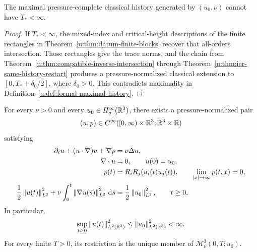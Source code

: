 \begin{corollary}
\label{u:cor:ier-maximal-time-contradiction}
The maximal pressure-complete classical history generated by
\((u_0,\nu)\) cannot have \(T_*<\infty\).
\end{corollary}

\begin{proof}
If \(T_*<\infty\), the mixed-index and critical-height descriptions of the
finite rectangles in Theorem~\ref{u:thm:datum-finite-blocks} recover that
all-orders intersection.  Those rectangles give the trace norms, and the chain from
Theorem~\ref{u:thm:compatible-inverse-intersection} through
Theorem~\ref{u:thm:ier-same-history-restart} produces a pressure-normalized classical
extension to \([0,T_*+\delta_0/2]\), where \(\delta_0>0\).  This contradicts
maximality in Definition~\ref{u:def:formal-maximal-history}.
\end{proof}

\begin{samepage}
\begin{theorem}
\label{u:thm:ier-global-smoothness}
For every \(\nu>0\) and every \(u_0\in H^\infty_\sigma(\mathbb R^3)\), there exists a
pressure-normalized pair
\begin{equation}
 (u,p)\in C^\infty([0,\infty)\times\mathbb R^3;\mathbb R^3\times\mathbb R)
 \label{u:eq:ier-global-class}
\end{equation}
satisfying
\begin{align}
 \partial_tu+(u\cdot\nabla)u+\nabla p&=\nu\Delta u,
 \label{u:eq:ier-global-momentum}\\
 \nabla\cdot u&=0,
 \qquad u(0)=u_0,
 \label{u:eq:ier-global-divergence-datum}\\
 p(t)&=R_iR_j(u_i(t)u_j(t)),
 \qquad \lim_{|x|\to\infty}p(t,x)=0,
 \label{u:eq:ier-global-pressure}\\
 \frac12\left\lVert u(t)\right\rVert_{L^2}^2
 +\nu\int_0^t\left\lVert \nabla u(s)\right\rVert_{L^2}^2\,\mathrm d s
 &=\frac12\left\lVert u_0\right\rVert_{L^2}^2,
 \qquad t\ge0.
 \label{u:eq:ier-global-energy}
\end{align}
In particular,
\begin{equation}
 \sup_{t\ge0}\left\lVert u(t)\right\rVert_{L^2(\mathbb R^3)}^2
 \le\left\lVert u_0\right\rVert_{L^2(\mathbb R^3)}^2<\infty.
 \label{u:eq:ier-global-energy-bound}
\end{equation}
For every finite \(T>0\), its restriction is the unique member of
\(\mathscr M_\nu^3(0,T;u_0)\).
\end{theorem}
\end{samepage}

